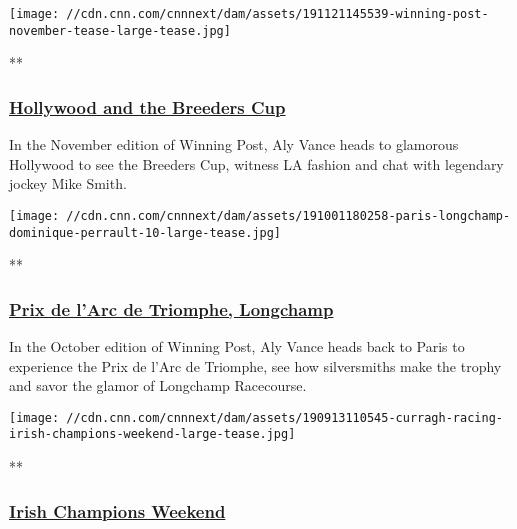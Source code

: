 \href{/videos/sports/2019/11/21/breeders-cup-santa-anita-hollywood-vintage-movie-style-winning-post-vision-spt-intl.cnn}{}

\texttt{[image: //cdn.cnn.com/cnnnext/dam/assets/191121145539-winning-post-november-tease-large-tease.jpg]}

**

\hypertarget{hollywood-and-the-breeders-cup}{%
\subsubsection{\texorpdfstring{\href{/videos/sports/2019/11/21/breeders-cup-santa-anita-hollywood-vintage-movie-style-winning-post-vision-spt-intl.cnn}{Hollywood
and the Breeders
Cup}}{Hollywood and the Breeders Cup}}\label{hollywood-and-the-breeders-cup}}

In the November edition of Winning Post, Aly Vance heads to glamorous
Hollywood to see the Breeders Cup, witness LA fashion and chat with
legendary jockey Mike Smith.

\href{/videos/sports/2019/10/31/prix-de-larc-de-triomphe-silversmith-enable-elegance-longchamp-winning-post-vision-spt-intl.cnn}{}

\texttt{[image: //cdn.cnn.com/cnnnext/dam/assets/191001180258-paris-longchamp-dominique-perrault-10-large-tease.jpg]}

**

\hypertarget{prix-de-larc-de-triomphe-longchamp}{%
\subsubsection{\texorpdfstring{\href{/videos/sports/2019/10/31/prix-de-larc-de-triomphe-silversmith-enable-elegance-longchamp-winning-post-vision-spt-intl.cnn}{Prix
de l'Arc de Triomphe,
Longchamp}}{Prix de l'Arc de Triomphe, Longchamp}}\label{prix-de-larc-de-triomphe-longchamp}}

In the October edition of Winning Post, Aly Vance heads back to Paris to
experience the Prix de l'Arc de Triomphe, see how silversmiths make the
trophy and savor the glamor of Longchamp Racecourse.

\href{/videos/sports/2019/10/30/irish-champions-weekend-ireland-kildare-horse-racing-winning-post-vision-spt-intl.cnn}{}

\texttt{[image: //cdn.cnn.com/cnnnext/dam/assets/190913110545-curragh-racing-irish-champions-weekend-large-tease.jpg]}

**

\hypertarget{irish-champions-weekend}{%
\subsubsection{\texorpdfstring{\href{/videos/sports/2019/10/30/irish-champions-weekend-ireland-kildare-horse-racing-winning-post-vision-spt-intl.cnn}{Irish
Champions
Weekend}}{Irish Champions Weekend}}\label{irish-champions-weekend}}

